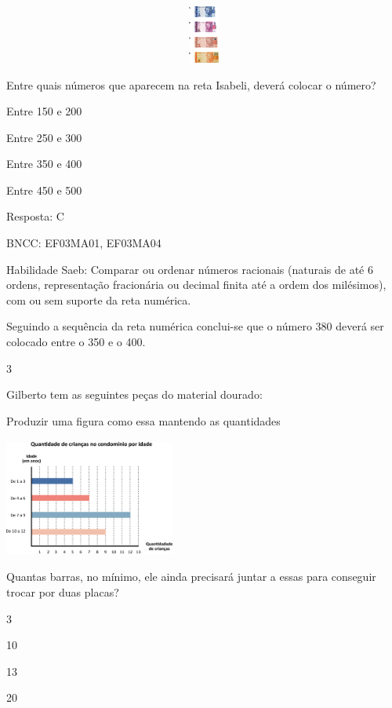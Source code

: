 \begin{escolha}
{\begin{escolha}
{\includegraphics[width=5.90556in,height=0.74931in]{media/image117.png}

Entre quais números que aparecem na reta Isabeli, deverá colocar o
número?

\begin{escolha}
\item
  Entre 150 e 200
\item
  Entre 250 e 300
\item
  Entre 350 e 400
\item
  Entre 450 e 500
\end{escolha}

Resposta: C

BNCC: EF03MA01, EF03MA04

Habilidade Saeb: Comparar ou ordenar números racionais (naturais de até
6 ordens, representação fracionária ou decimal finita até a ordem dos
milésimos), com ou sem suporte da reta numérica.

Seguindo a sequência da reta numérica conclui-se que o número 380 deverá
ser colocado entre o 350 e o 400.

\num{3}

Gilberto tem as seguintes peças do material dourado:

Produzir uma figura como essa mantendo as quantidades

\includegraphics[width=2.20852in,height=1.52513in]{media/image118.png}

Quantas barras, no mínimo, ele ainda precisará juntar a essas para
conseguir trocar por duas placas?

\begin{escolha}
\item
  3
\item
  10
\item
  13
\item
  20
\end{escolha}

}
\end{escolha}}
\end{escolha}
